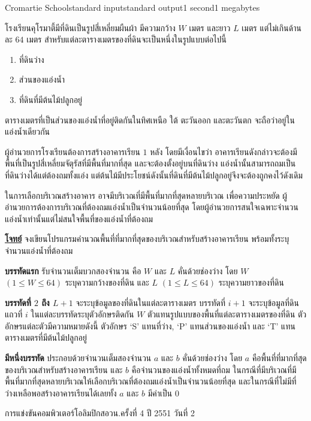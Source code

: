 \documentclass[11pt,a4paper]{article}
\begin{document}
\begin{problem}{Cromartie School}{standard input}{standard output}{1 second}{1 megabytes}

โรงเรียนคุโรมาตี้มีที่ดินเป็นรูปสี่เหลี่ยมผืนผ้า มีความกว้าง $W$ เมตร และยาว $L$ เมตร แต่ไม่เกินด้านละ $64$ เมตร สำหรับแต่ละตารางเมตรของที่ดินจะเป็นหนึ่งในรูปแบบต่อไปนี้

\begin{enumerate}
\item ที่ดินว่าง
\item ส่วนของแอ่งน้ำ 
\item ที่ดินที่มีต้นไม้ปลูกอยู่
\end{enumerate}

ตารางเมตรที่เป็นส่วนของแอ่งน้ำที่อยู่ติดกันในทิศเหนือ ใต้ ตะวันออก และตะวันตก จะถือว่าอยู่ในแอ่งน้ำเดียวกัน

ผู้อำนวยการโรงเรียนต้องการสร้างอาคารเรียน $1$ หลัง โดยมีเงื่อนไขว่า อาคารเรียนดังกล่าวจะต้องมีพื้นที่เป็นรูปสี่เหลี่ยมจัตุรัสที่มีพื้นที่มากที่สุด และจะต้องตั้งอยู่บนที่ดินว่าง แอ่งน้ำนั้นสามารถถมเป็นที่ดินว่างได้แต่ต้องถมทั้งแอ่ง แต่ต้นไม้มีประโยชน์ดังนั้นที่ดินที่มีต้นไม้ปลูกอยู่จึงจะต้องถูกคงไว้ดังเดิม

ในการเลือกบริเวณสร้างอาคาร อาจมีบริเวณที่มีพื้นที่มากที่สุดหลายบริเวณ  เพื่อความประหยัด ผู้อำนวยการต้องการบริเวณที่ต้องถมแอ่งน้ำเป็นจำนวนน้อยที่สุด   โดยผู้อำนวยการสนใจเฉพาะจำนวนแอ่งน้ำเท่านั้นแต่ไม่สนใจพื้นที่ของแอ่งน้ำที่ต้องถม

\bigskip
\underline{\textbf{โจทย์}}  จงเขียนโปรแกรมคำนวณพื้นที่ที่มากที่สุดของบริเวณสำหรับสร้างอาคารเรียน พร้อมทั้งระบุจำนวนแอ่งน้ำที่ต้องถม

\InputFile

\textbf{บรรทัดแรก} รับจำนวนเต็มบวกสองจำนวน คือ $W$ และ $L$ คั่นด้วยช่องว่าง โดย $W$ $(1 \leq W \leq 64)$ ระบุความกว้างของที่ดิน และ $L$ $(1 \leq L \leq 64)$ ระบุความยาวของที่ดิน

\textbf{บรรทัดที่ $2$ ถึง $L+1$} จะระบุข้อมูลของที่ดินในแต่ละตารางเมตร บรรทัดที่ $i+1$ จะระบุข้อมูลที่ดินแถวที่ $i$ ในแต่ละบรรทัดระบุตัวอักษรติดกัน $W$ ตัวแทนรูปแบบของพื้นที่แต่ละตารางเมตรของที่ดิน ตัวอักษรแต่ละตัวมีความหมายดังนี้ ตัวอักษร ‘S’ แทนที่ว่าง, ‘P’ แทนส่วนของแอ่งน้ำ และ ‘T’ แทนตารางเมตรที่มีต้นไม้ปลูกอยู่

\newpage
\OutputFile

\textbf{มีหนึ่งบรรทัด} ประกอบด้วยจำนวนเต็มสองจำนวน $a$ และ $b$ คั่นด้วยช่องว่าง โดย $a$ คือพื้นที่ที่มากที่สุดของบริเวณสำหรับสร้างอาคารเรียน และ $b$ คือจำนวนของแอ่งน้ำทั้งหมดที่ถม ในกรณีที่มีบริเวณที่มีพื้นที่มากที่สุดหลายบริเวณให้เลือกบริเวณที่ต้องถมแอ่งน้ำเป็นจำนวนน้อยที่สุด และในกรณีที่ไม่มีที่ว่างเหลือพอสร้างอาคารเรียนได้เลยทั้ง $a$ และ $b$ มีค่าเป็น $0$

\Examples

\begin{example}
%
%
%
\end{example}


\Source

การแข่งขันคอมพิวเตอร์โอลิมปิกสอวน.ครั้งที่ 4 ปี 2551 วันที่ 2

\end{problem}
\end{document}
